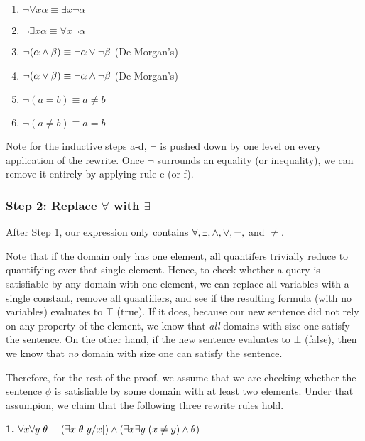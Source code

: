 \documentclass{article}
\begin{document}
\begin{enumerate}[label = {\alph*)}, itemsep=0mm]
    \item $\neg \forall x \alpha \equiv \exists x \neg \alpha$
    \item $\neg \exists x \alpha \equiv \forall x \neg \alpha$
    \item $\neg (\alpha \wedge \beta) \equiv \neg \alpha \vee \neg \beta$ (De Morgan's)
    \item $\neg (\alpha \vee \beta) \equiv \neg \alpha \wedge \neg \beta$ (De Morgan's)
    \item $\neg (a = b) \equiv a \neq b$
    \item $\neg (a \neq b) \equiv a = b$
\end{enumerate}

Note for the inductive steps a-d, $\neg$ is pushed down by one level on every
application of the rewrite. Once $\neg$ surrounds an equality (or inequality),
we can remove it entirely by applying rule e (or f).

\subsubsection{Step 2: Replace $\forall$ with $\exists$}

After Step 1, our expression only contains $\forall, \exists, \wedge, \vee, =,$
and $\neq$.

Note that if the domain only has one element, all quantifers trivially reduce
to quantifying over that single element. Hence, to check whether a query is
satisfiable by any domain with one element, we can replace all variables with a
single constant, remove all quantifiers, and see if the resulting formula (with
no variables) evaluates to $\top$ (true). If it does, because our new sentence
did not rely on any property of the element, we know that {\em all} domains
with size one satisfy the sentence. On the other hand, if the new sentence
evaluates to $\bot$ (false), then we know that {\em no} domain with size one
can satisfy the sentence.

Therefore, for the rest of the proof, we assume that we are checking whether
the sentence $\phi$ is satisfiable by some domain with at least two elements.
Under that assumpion, we claim that the following three rewrite rules hold.

\bigskip
\textbf{1. }{\boldmath $\forall x \forall y \; \theta \equiv (\exists x \; \theta[y/x]) \wedge (\exists x \exists y \; (x \neq y) \wedge \theta)$ }
\smallskip
\end{document}
